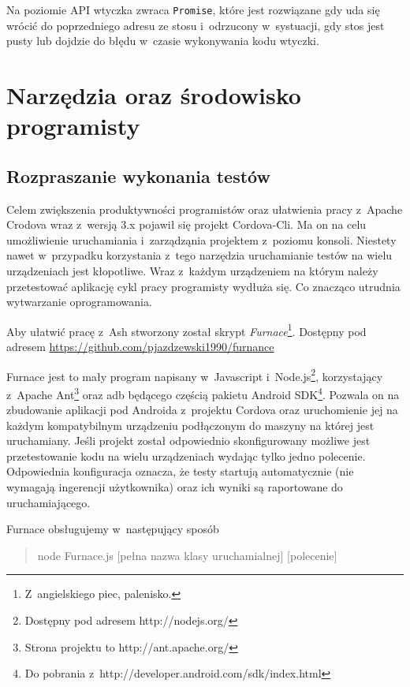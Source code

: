 \documentclass[brudnopis]{xmgr}
\begin{document}
Na poziomie API wtyczka zwraca \texttt{Promise}, które jest rozwiązane gdy uda się wrócić do poprzedniego adresu ze stosu i~odrzucony w~systuacji, gdy stos jest pusty lub dojdzie do błędu w~czasie wykonywania kodu wtyczki.

\chapter{Narzędzia oraz środowisko programisty}

\section{Rozpraszanie wykonania testów}

Celem zwiększenia produktywności programistów oraz ułatwienia pracy z~Apache Crodova wraz z~wersją 3.x pojawił się projekt Cordova-Cli. Ma on na celu umożliwienie uruchamiania i~zarządząnia projektem z~poziomu konsoli. Niestety nawet w~przypadku korzystania z~tego narzędzia uruchamianie testów na wielu urządzeniach jest kłopotliwe. Wraz z~każdym urządzeniem na którym należy przetestować aplikację cykl pracy programisty wydłuża się. Co znacząco utrudnia wytwarzanie oprogramowania.

Aby ułatwić pracę z~Ash stworzony został skrypt \textit{Furnace}\footnote{Z~angielskiego piec, palenisko.}. Dostępny pod adresem \url{https://github.com/pjazdzewski1990/furnance}

Furnace jest to mały program napisany w~Javascript i~Node.js\footnote{Dostępny pod adresem http://nodejs.org/}, korzystający z~Apache Ant\footnote{Strona projektu to  http://ant.apache.org/} oraz adb będącego częścią pakietu Android SDK\footnote{Do pobrania z~http://developer.android.com/sdk/index.html}. Pozwala on na zbudowanie aplikacji pod Androida z~projektu Cordova oraz uruchomienie jej na każdym kompatybilnym urządzeniu podłączonym do maszyny na której jest uruchamiany. Jeśli projekt został odpowiednio skonfigurowany możliwe jest przetestowanie kodu na wielu urządzeniach wydając tylko jedno polecenie. Odpowiednia konfiguracja oznacza, że testy startują automatycznie (nie wymagają ingerencji użytkownika) oraz ich wyniki są raportowane do uruchamiającego. 

Furnace obsługujemy w~następujący sposób

\begin{quote}
	node Furnace.js [pełna nazwa klasy uruchamialnej] [polecenie]
\end{quote}
\end{document}
